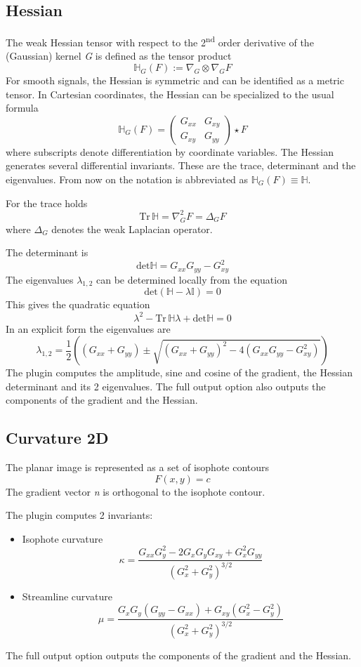 \documentclass{amsart}
\begin{document}
\subsection{Hessian}\label{sec:hessian}

The weak Hessian tensor with respect to the 2\textsuperscript{nd} order derivative of the (Gaussian) kernel \textit{G} is defined as the tensor product
\[
\mathbb{H}_G (F) := \nabla_G \otimes \nabla_G F
\]
For smooth signals, the Hessian is symmetric and can be identified as a metric tensor.
In Cartesian coordinates, the Hessian can be specialized to the usual formula
\[
\mathbb{H}_G (F)=  \left( \begin{array}{ll}
	G_{xx}  & G_{xy} \\
	G_{xy} & G_{yy}
\end{array} \right) \star F 
\]
where  subscripts denote differentiation by coordinate variables. 
The Hessian generates several  differential invariants.
These are the trace, determinant and the eigenvalues. From now on the notation is abbreviated as $\mathbb{H}_G (F)\equiv \mathbb{H} $.

For the trace holds 
\[
\mathrm{Tr} \,\mathbb{H} = \nabla_G^2 F = \Delta_{G} F
\]
where $ \Delta_{G}$ denotes the weak Laplacian operator.  

The determinant is
\[
\mathrm{det} \mathbb{H}  = G_{xx} G_{yy}- G_{xy}^2
\]
The eigenvalues $\lambda_{1,2}$ can be determined locally from the equation 
\[
	\mathrm{det} (\mathbb{H} - \lambda \mathbb{I} )= 0
\]
This gives the quadratic equation
\[
\lambda^2 - \mathrm{Tr} \,\mathbb{H}  \lambda + 	\mathrm{det} \mathbb{H} =  0
\]
In an explicit form the eigenvalues are
\[
\lambda_{1,2}=\frac{1}{2} \left( (G_{xx} + G_{yy}) \pm \sqrt{(G_{xx} + G_{yy})^2 - 4   \left(  G_{xx} G_{yy}- G_{xy}^2 \right)  } \right) 
\]
The plugin computes the amplitude, sine and cosine of the gradient, the Hessian determinant and its 2 eigenvalues. 
The full output option also outputs the components of the gradient and the Hessian.
\subsection{Curvature 2D}
The planar image is represented as a set of isophote contours
\[
F(x,y) = c
\]
The gradient vector \textit{n} is orthogonal to the isophote contour.

The plugin computes 2 invariants:
\begin{itemize}
	\item Isophote curvature
	\[  
	\kappa= \frac{ G_{xx} G_{y}^2 - 2 G_{x} G_{y} G_{xy} + G_{x}^2 G_{yy}}   {\left(  G_{x}^2 +G_{y}^2\right)^{3/2}}
	\]
	\item Streamline curvature
	\[
	\mu = \frac{ G_x G_y \left(  G_{yy} -  G_{xx} \right) +G_{xy}\left(   G_x^2  -  G_y^2\right)    }   {\left(  G_{x}^2 +G_{y}^2\right)^{3/2}}
	\]
\end{itemize}
The full output option outputs the components of the gradient and the Hessian.
\end{document}
